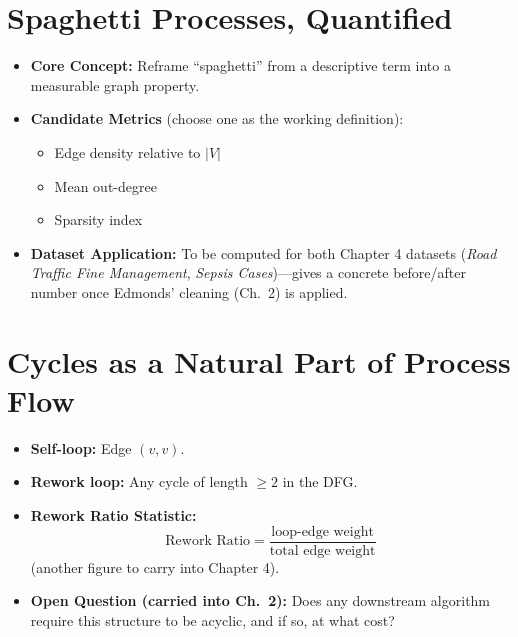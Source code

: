 \section{Spaghetti Processes, Quantified}
\begin{itemize}[leftmargin=*]
	\item \textbf{Core Concept:} Reframe ``spaghetti'' from a descriptive term into a measurable graph property.
	\item \textbf{Candidate Metrics} (choose one as the working definition):
	\begin{itemize}
		\item Edge density relative to $|V|$
		\item Mean out-degree
		\item Sparsity index
	\end{itemize}
	\item \textbf{Dataset Application:} To be computed for both Chapter 4 datasets (\emph{Road Traffic Fine Management}, \emph{Sepsis Cases})—gives a concrete before/after number once Edmonds' cleaning (Ch.~2) is applied.
\end{itemize}

\section{Cycles as a Natural Part of Process Flow}
\begin{itemize}[leftmargin=*]
	\item \textbf{Self-loop:} Edge $(v,v)$.
	\item \textbf{Rework loop:} Any cycle of length $\geq 2$ in the DFG.
	\item \textbf{Rework Ratio Statistic:}
	\[
	\text{Rework Ratio} = \frac{\text{loop-edge weight}}{\text{total edge weight}}
	\]
	(another figure to carry into Chapter 4).
	\item \textbf{Open Question (carried into Ch.~2):} Does any downstream algorithm require this structure to be acyclic, and if so, at what cost?
\end{itemize}